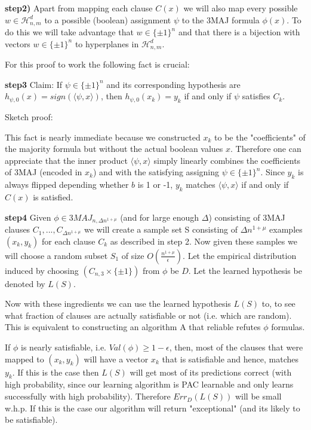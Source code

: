 \documentclass[11pt,a4paper]{article}
\begin{document}
\textbf{step2)} Apart from mapping each clause $C(x)$ we will also map every possible $w \in\mathcal{H}^d_{n,m}$ to a possible (boolean) assignment $\psi $ to the 3MAJ formula $\phi(x)$.
To do this we will take advantage that $w \in \{ \pm 1 \}^n $ and that there is a bijection with vectors $w \in \{ \pm 1 \}^n $ to hyperplanes in $\mathcal{H}^d_{n,m}$.

For this proof to work the following fact is crucial:

\textbf{step3} Claim: If $\psi \in \{ \pm 1 \}^n $ and its corresponding hypothesis are $h_{\psi, 0} (x) = sign ( \langle \psi , x \rangle )$, then $h_{\psi, 0} (x_k) = y_k$ if and only if $\psi$ satisfies $C_k$.

Sketch proof:

This fact is nearly immediate because we constructed $x_k$ to be the "coefficients" of the majority formula but without the actual boolean values $x$. Therefore one can appreciate that the inner product  $ \langle \psi , x \rangle $ simply linearly combines the coefficients of 3MAJ (encoded in $x_k$) and with the satisfying assigning $\psi \in \{ \pm 1\}^n$. Since $y_k$ is always flipped depending whether $b$ is 1 or -1, $y_k$ matches $\langle \psi , x \rangle $ if and only if $C(x)$ is satisfied.

\textbf{step4} Given $\phi \in 3MAJ_{n, \Delta n^{1 + \mu}}$ (and for large enough $\Delta$) consisting of 3MAJ clauses $C_1, ..., C_{\Delta n^{1 + \mu}}$ we will create a sample set S consisting of $\Delta n^{1 + \mu}$ examples $(x_k, y_k)$ for each clause $C_k$ as described in step 2. Now given these samples we will choose a random subset $S_1$ of size $O(\frac{n^{1+\mu}}{\epsilon} )$. Let the empirical distribution induced by choosing $(C_{n,3} \times \{ \pm 1\})$ from $\phi$ be $D$. Let the learned hypothesis be denoted by $L(S)$.

Now with these ingredients we can use the learned hypothesis $L(S)$ to, to see what fraction of clauses are actually satisfiable or not (i.e. which are random). This is equivalent to constructing an algorithm A that reliable refutes $\phi$ formulas.

If $\phi$ is nearly satisfiable, i.e. $Val(\phi) \geq 1 - \epsilon$, then, most of the clauses that were mapped to $(x_k, y_k)$ will have a vector $x_k$ that is satisfiable and hence, matches $y_k$. If this is the case then $L(S)$ will get most of its predictions correct (with high probability, since our learning algorithm is PAC learnable and only learns successfully with high probability). Therefore $ Err_{D}(L(S)) $ will be small w.h.p. If this is the case our algorithm will return "exceptional" (and its likely to be satisfiable).
\end{document}
